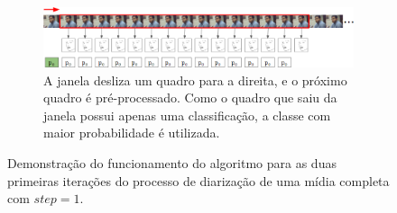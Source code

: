 \begin{figure}[ht]
    \begin{subfigure}[b]{\textwidth}
        \includegraphics[width=\textwidth]{figures/alg_demo_7.png}
        \caption{A janela desliza um quadro para a direita, e o próximo quadro é pré-processado. Como o quadro que saiu da janela possui apenas uma classificação, a classe com maior probabilidade é utilizada.}
    \end{subfigure}
    \caption{Demonstração do funcionamento do algoritmo para as duas primeiras iterações do processo de diarização de uma mídia completa com $step = 1$.}
\end{figure}

